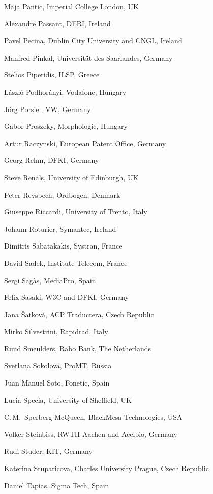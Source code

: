 \documentclass[10pt, plain]{../../metanetpaper}
\begin{document}
\begin{multicols}{3}
\begin{small}
\begin{enumerate}
{      \item Maja Pantic, Imperial College London, UK
      \item Alexandre Passant, DERI, Ireland
      \item Pavel Pecina, Dublin City University and CNGL, Ireland
      \item Manfred Pinkal, Universität des Saarlandes, Germany
      \item Stelios Piperidis, ILSP, Greece
      \item László Podhorányi, Vodafone, Hungary
      \item Jörg Porsiel, VW, Germany
      \item Gabor Proszeky, Morphologic, Hungary
      \item Artur Raczynski, European Patent Office, Germany
      \item Georg Rehm, DFKI, Germany
      \item Steve Renals, University of Edinburgh, UK
      \item Peter Revsbech, Ordbogen, Denmark
      \item Giuseppe Riccardi, University of Trento, Italy
      \item Johann Roturier, Symantec, Ireland
      \item Dimitris Sabatakakis, Systran, France
      \item David Sadek, Institute Telecom, France
      \item Sergi Sagàs, MediaPro, Spain
      \item Felix Sasaki, W3C and DFKI, Germany
      \item Jana Šatková, ACP Traductera, Czech Republic
      \item Mirko Silvestrini, Rapidrad, Italy
      \item Ruud Smeulders, Rabo Bank, The Netherlands
      \item Svetlana Sokolova, ProMT, Russia
      \item Juan Manuel Soto, Fonetic, Spain
      \item Lucia Specia, University of Sheffield, UK
      \item C.\,M.~Sperberg-McQueen, BlackMesa Technologies, USA
      \item Volker Steinbiss, RWTH Aachen and Accipio, Germany
      \item Rudi Studer, KIT, Germany
      \item Katerina Stuparicova, Charles University Prague, Czech Republic
      \item Daniel Tapias, Sigma Tech, Spain
}
\end{enumerate}
\end{small}
\end{multicols}
\end{document}
